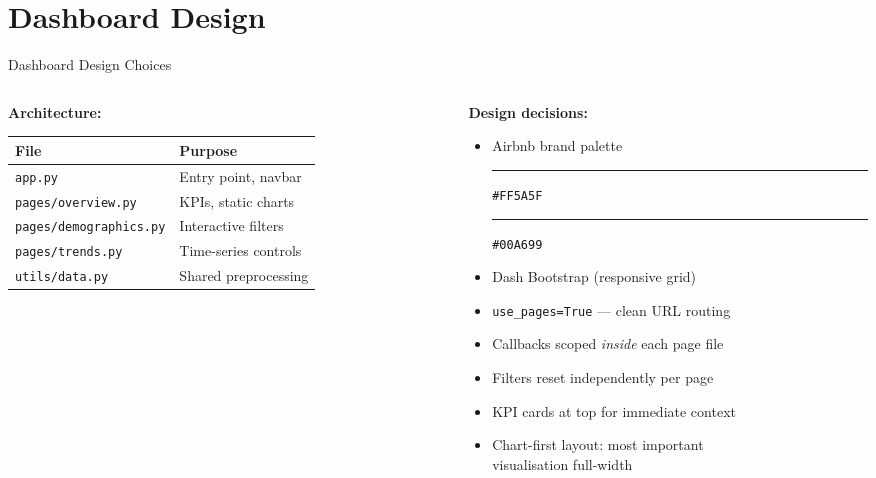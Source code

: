 \documentclass[aspectratio=169]{beamer}
\begin{document}
\section{Dashboard Design}
\begin{frame}{Dashboard Design Choices}
  \begin{columns}[T]
    \begin{column}{0.48\textwidth}
      \textbf{Architecture:}\\[4pt]
      \begin{tabular}{ll}
        \toprule
        File & Purpose \\
        \midrule
        \texttt{app.py}           & Entry point, navbar \\
        \texttt{pages/overview.py}    & KPIs, static charts \\
        \texttt{pages/demographics.py}& Interactive filters \\
        \texttt{pages/trends.py}      & Time-series controls \\
        \texttt{utils/data.py}        & Shared preprocessing \\
        \bottomrule
      \end{tabular}
    \end{column}
    \begin{column}{0.48\textwidth}
      \textbf{Design decisions:}
      \begin{itemize}
        \item Airbnb brand palette\\
              {\color{AirRed}\rule{12pt}{8pt}} \texttt{\#FF5A5F} \;
              {\color{AirTeal}\rule{12pt}{8pt}} \texttt{\#00A699}
        \item Dash Bootstrap (responsive grid)
        \item \texttt{use\_pages=True} --- clean URL routing
        \item Callbacks scoped \emph{inside} each page file
        \item Filters reset independently per page
        \item KPI cards at top for immediate context
        \item Chart-first layout: most important\\
              visualisation full-width
      \end{itemize}
    \end{column}
  \end{columns}
\end{frame}
\end{document}
